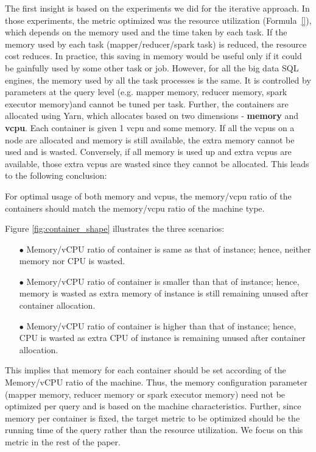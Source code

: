 The first insight is based on the experiments we did for the iterative approach. In those experiments, the metric optimized was the resource utilization (Formula~\ref{}), which depends on the memory used and the time taken by each task. If the memory used by each task (mapper/reducer/spark task) is reduced, the resource cost reduces. In practice, this saving in memory would be useful only if it could be gainfully used by some other task or job. However, for all the big data SQL engines, the memory used by all the task processes is the same. It is controlled by parameters at the query level (e.g. mapper memory, reducer memory, spark executor memory)and cannot be tuned per task. Further, the containers are allocated using Yarn, which allocates based on two dimensions - \textbf{memory} and \textbf{vcpu}. Each container is given 1 vcpu and some memory. If all the vcpus on a node are allocated and memory is still available, the extra memory cannot be used and is wasted. Conversely, if all memory is used up and extra vcpus are available, those extra vcpus are wasted since they cannot be allocated. This leads to the following conclusion:
\begin{insight}
	For optimal usage of both memory and vcpus, the memory/vcpu ratio of the containers should match the memory/vcpu ratio of the machine type.
\end{insight}
Figure \ref{fig:container_shape} illustrates the three scenarios:
\begin{enumerate}[label=(\alph*)]
	\item[$\bullet$] Memory/vCPU ratio of container is same as that of instance; hence, neither memory nor CPU is wasted. 
	\item[$\bullet$] Memory/vCPU ratio of container is smaller than that of instance; hence, memory is wasted as extra memory of instance is still remaining unused after container allocation.
	\item[$\bullet$] Memory/vCPU ratio of container is higher than that of instance; hence, CPU is wasted as extra CPU of instance is remaining unused after container allocation.
\end{enumerate}
This implies that memory for each container should be set according of the Memory/vCPU ratio of the machine. Thus, the memory configuration parameter (mapper memory, reducer memory or spark executor memory) need not be optimized per query and is based on the machine characteristics. Further, since memory per container is fixed, the target metric to be optimized should be the running time of the query rather than the resource utilization. We focus on this metric in the rest of the paper.


